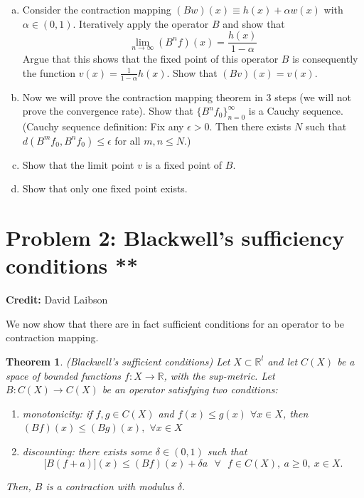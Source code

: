 \documentclass[11pt]{extarticle}
\theoremstyle{plain}
\newtheorem{thm}{Theorem}
\theoremstyle{definition}
\begin{document}
\begin{enumerate}[(a)]
\item Consider the contraction mapping $(Bw)(x) \equiv h(x) + \alpha w(x)$ with $\alpha \in (0, 1)$. Iteratively apply the operator $B$ and show that 
\begin{equation*}
	\lim_{n \to \infty} (B^n f)(x) = \frac{h(x)}{1-\alpha}
\end{equation*}
Argue that this shows that the fixed point of this operator $B$ is consequently the function $v(x) = \frac{1}{1-\alpha} h(x)$. Show that $(Bv)(x) = v(x)$. 


\item Now we will prove the contraction mapping theorem in 3 steps (we will not prove the convergence rate). Show that $\{ B^n f_0\}_{n=0}^\infty$ is a Cauchy sequence. (Cauchy sequence definition: Fix any $\epsilon > 0$. Then there exists $N$ such that $d(B^m f_0, B^n f_0) \leq \epsilon$ for all $m, n \leq N$.) 


\item Show that the limit point $v$ is a fixed point of $B$. 

\item Show that only one fixed point exists. 


\end{enumerate}




\vspace{10mm}
\section*{Problem 2: Blackwell's sufficiency conditions  **}

\textbf{Credit:} David Laibson


\vspace{5mm}
\noindent
We now show that there are in fact sufficient conditions for an operator to be contraction mapping.

\begin{thm}
	
	(Blackwell's sufficient conditions) Let $X \subset \mathbb R^l$ and let $C(X)$ be a space of bounded functions $f:X \to \mathbb R$, with the sup-metric. Let $B : C(X) \to C(X)$ be an operator satisfying two conditions:
	\begin{enumerate}[1.]
		\item monotonicity: if $f,g\in C(X)$ and $f(x)\leq g(x)$ $\forall x\in X$,%
		\newline
		then $(Bf)(x)\leq (Bg)(x),$ $\forall x\in X$\newline
		
		\item discounting: there exists some $\delta \in (0,1)$ such that 
		\[
		\lbrack B(f+a)](x)\leq (Bf)(x)+\delta a\text{ \ }\forall \text{ }f\in C(X),\
		a\geq 0,\ x\in X. 
		\]%
	\end{enumerate}
	
	\noindent
	Then, $B$ is a contraction with modulus $\delta$.
\end{thm}
\end{document}
